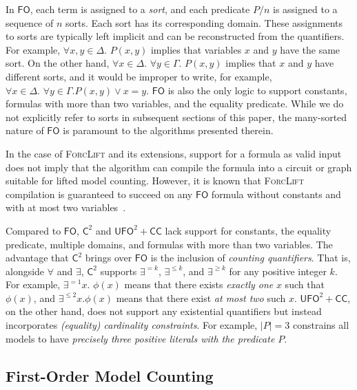 \documentclass[a4paper,UKenglish,cleveref, autoref, thm-restate]{lipics-v2021}
\newcommand{\Ctwo}{$\mathsf{C}^{2}$}
\newcommand{\FO}{$\mathsf{FO}$}
\newcommand{\UFO}{$\mathsf{UFO}^{2} + \mathsf{CC}$}
\begin{document}
In \FO{}, each term is assigned to a \emph{sort}, and each predicate $P/n$ is
assigned to a sequence of $n$ sorts. Each sort has its corresponding domain.
These assignments to sorts are typically left implicit and can be reconstructed
from the quantifiers. For example, $\forall x,y \in \Delta\text{. }P(x, y)$
implies that variables $x$ and $y$ have the same sort. On the other hand,
$\forall x \in \Delta\text{. }\forall y \in \Gamma\text{. } P(x, y)$ implies
that $x$ and $y$ have different sorts, and it would be improper to write, for
example, $\forall x \in \Delta\text{. }\forall y \in \Gamma\text{.
} P(x, y) \lor x = y$. \FO{} is also the only logic to support constants,
formulas with more than two variables, and the equality predicate. While we do
not explicitly refer to sorts in subsequent sections of this paper, the
many-sorted nature of \FO{} is paramount to the algorithms presented therein.

\begin{remark*}
  In the case of \textsc{ForcLift} and its extensions, support for a formula as
  valid input does not imply that the algorithm can compile the formula into a
  circuit or graph suitable for lifted model counting. However, it is known that
  \textsc{ForcLift} compilation is guaranteed to succeed on any \FO{} formula
  without constants and with at most two
  variables~\cite{DBLP:conf/nips/Broeck11,DBLP:conf/kr/BroeckMD14}.
\end{remark*}

Compared to \FO{}, \Ctwo{} and \UFO{} lack support for constants, the equality
predicate, multiple domains, and formulas with more than two variables. The
advantage that \Ctwo{} brings over \FO{} is the inclusion of \emph{counting
  quantifiers}. That is, alongside $\forall$ and $\exists$, \Ctwo{} supports
$\exists^{=k}$, $\exists^{\le k}$, and $\exists^{\ge k}$ for any positive
integer $k$. For example, $\exists^{=1} x\text{. }\phi(x)$ means that there
exists \emph{exactly one} $x$ such that $\phi(x)$, and $\exists^{\le 2} x\text{.
}\phi(x)$ means that there exist \emph{at most two} such $x$. \UFO{}, on the
other hand, does not support any existential quantifiers but instead
incorporates \emph{(equality) cardinality constraints}. For example, $|P| = 3$
constrains all models to have \emph{precisely three positive literals with the
  predicate $P$}.

\subsection{First-Order Model Counting}
\end{document}

